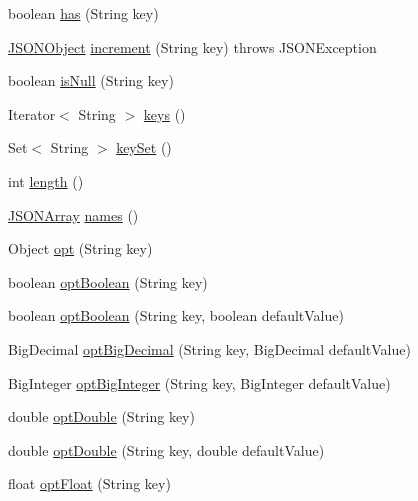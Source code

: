 \begin{DoxyCompactItemize}
\item 
boolean \hyperlink{classorg_1_1json_1_1JSONObject_aa3d594c3e7a5b6d9b89aa6cda03bac28}{has} (String key)
\item 
\hyperlink{classorg_1_1json_1_1JSONObject}{J\-S\-O\-N\-Object} \hyperlink{classorg_1_1json_1_1JSONObject_a4c808cfee4389ecf543781feaa1b950c}{increment} (String key)  throws J\-S\-O\-N\-Exception 
\item 
boolean \hyperlink{classorg_1_1json_1_1JSONObject_a8de41c5807522df5a7b888a0ffd6b69b}{is\-Null} (String key)
\item 
Iterator$<$ String $>$ \hyperlink{classorg_1_1json_1_1JSONObject_aff3bbed67e07e0714a04470d0640a5be}{keys} ()
\item 
Set$<$ String $>$ \hyperlink{classorg_1_1json_1_1JSONObject_a6ab562229c57b51785e17c4179b31c87}{key\-Set} ()
\item 
int \hyperlink{classorg_1_1json_1_1JSONObject_a2c47910737728e063a8395d3a9152d42}{length} ()
\item 
\hyperlink{classorg_1_1json_1_1JSONArray}{J\-S\-O\-N\-Array} \hyperlink{classorg_1_1json_1_1JSONObject_a02e83de70e290231527d1760c4dd30fc}{names} ()
\item 
Object \hyperlink{classorg_1_1json_1_1JSONObject_a51eeabb3fde00474d3ffd7381ad5d311}{opt} (String key)
\item 
boolean \hyperlink{classorg_1_1json_1_1JSONObject_ae2fd84f0e465ade590e47ba7bdce683b}{opt\-Boolean} (String key)
\item 
boolean \hyperlink{classorg_1_1json_1_1JSONObject_ae46a66bde2bc443b63ed93cb26677e34}{opt\-Boolean} (String key, boolean default\-Value)
\item 
Big\-Decimal \hyperlink{classorg_1_1json_1_1JSONObject_a5bfcfddd039cd791d1337f575d06540a}{opt\-Big\-Decimal} (String key, Big\-Decimal default\-Value)
\item 
Big\-Integer \hyperlink{classorg_1_1json_1_1JSONObject_a3117de378a1e3df3149be1d951db7ad0}{opt\-Big\-Integer} (String key, Big\-Integer default\-Value)
\item 
double \hyperlink{classorg_1_1json_1_1JSONObject_a69bf1cb7de87f4b196c0081ddc4c6f58}{opt\-Double} (String key)
\item 
double \hyperlink{classorg_1_1json_1_1JSONObject_ab5c3964b0ef382a85927000e743f8281}{opt\-Double} (String key, double default\-Value)
\item 
float \hyperlink{classorg_1_1json_1_1JSONObject_ab51c4b3e6851330f5311731ba0808297}{opt\-Float} (String key)
\item 

\end{DoxyCompactItemize}
